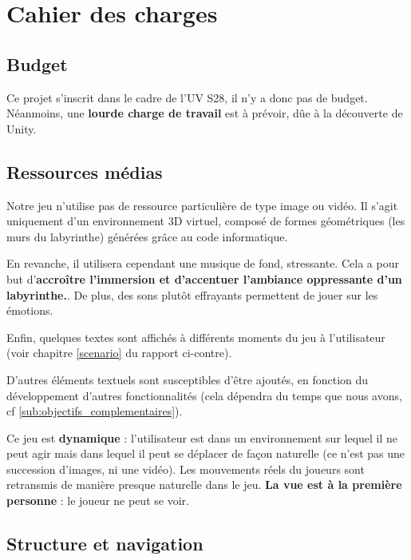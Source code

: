 \chapter{Cahier des charges}

\section{Budget}

Ce projet s'inscrit dans le cadre de l'UV S28, il n'y a donc pas de budget. Néanmoins, une \textbf{lourde charge de travail} est à prévoir, dûe à la découverte de Unity.

\section{Ressources médias}

Notre jeu n'utilise pas de ressource particulière de type image ou vidéo. Il s'agit uniquement d'un environnement 3D virtuel, composé de formes géométriques (les murs du labyrinthe) générées grâce au code informatique.

\medskip

En revanche, il utilisera cependant une musique de fond, \og stressante\fg{}. Cela a pour but d'\textbf{accroître l'immersion et d'accentuer l'ambiance oppressante d'un labyrinthe.}. De plus, des sons plutôt effrayants permettent de jouer sur les émotions.

\medskip

Enfin, quelques textes sont affichés à différents moments du jeu à l'utilisateur (voir chapitre \ref{scenario} du rapport ci-contre).

\medskip

D'autres éléments textuels sont susceptibles d'être ajoutés, en fonction du développement d'autres fonctionnalités (cela dépendra du temps que nous avons, cf \ref{sub:objectifs_complementaires}).

\bigskip

Ce jeu est \textbf{dynamique} : l'utilisateur est dans un environnement sur lequel il ne peut agir mais dans lequel il peut se déplacer de façon naturelle (ce n'est pas une succession d'images, ni une vidéo). Les mouvements réels du joueurs sont retransmis de manière presque naturelle dans le jeu. \textbf{La vue est à la première personne} : le joueur ne peut se voir.

\section{Structure et navigation}

